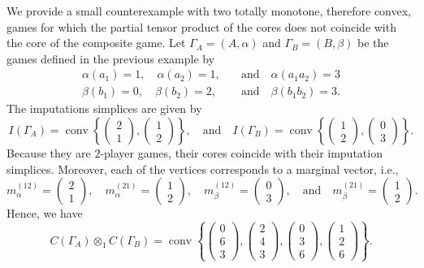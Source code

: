 \documentclass[a4paper,12pt]{amsart}
\begin{document}
\begin{example}
    We provide a small counterexample with two totally monotone, therefore convex, games for which the partial tensor product of the cores does not coincide with the core of the composite game. Let \(\Gamma_A = (A, \alpha)\) and \(\Gamma_B = (B, \beta)\) be the games defined in the previous example by 
    \[ \begin{aligned} 
    \alpha(a_1) = 1, \quad \alpha(a_2) = 1, \quad & \text{and} \quad \alpha(a_1 a_2) = 3 \\
    \beta(b_1) = 0, \quad \beta(b_2) = 2, \quad & \text{and} \quad \beta(b_1 b_2) = 3. 
    \end{aligned} \]
    The imputations simplices are given by 
    \[
    I(\Gamma_A) = \operatorname{conv} \left\{\begin{pmatrix} 2 \\ 1 \end{pmatrix}, \begin{pmatrix} 1 \\ 2 \end{pmatrix} \right\}, \quad \text{and} \quad I(\Gamma_B) = \operatorname{conv} \left\{ \begin{pmatrix} 1 \\ 2 \end{pmatrix}, \begin{pmatrix} 0 \\ 3 \end{pmatrix} \right\}. 
    \]
    Because they are \(2\)-player games, their cores coincide with their imputation simplices. Moreover, each of the vertices corresponds to a marginal vector, i.e., 
    \[
    m^{(12)}_\alpha = \begin{pmatrix} 2 \\ 1 \end{pmatrix}, \quad m^{(21)}_\alpha = \begin{pmatrix} 1 \\ 2 \end{pmatrix}, \quad m^{(12)}_\beta = \begin{pmatrix} 0 \\ 3 \end{pmatrix}, \quad \text{and} \quad m^{(21)}_\beta = \begin{pmatrix} 1 \\ 2 \end{pmatrix}.
    \]
    Hence, we have 
    \[
    C(\Gamma_A) \otimes_1 C(\Gamma_B) = \operatorname{conv} \left\{\begin{pmatrix} 0 \\ 6 \\ 3 \end{pmatrix}, \begin{pmatrix} 2 \\ 4 \\ 3 \end{pmatrix}, \begin{pmatrix} 0 \\ 3 \\ 6 \end{pmatrix},  \begin{pmatrix} 1 \\ 2 \\ 6 \end{pmatrix} \right\}. 
\]
\end{example}
\end{document}
